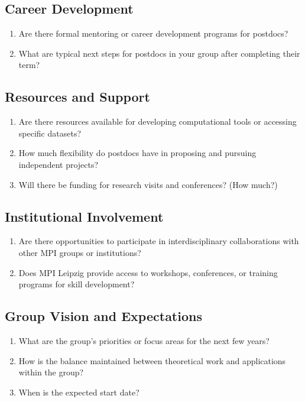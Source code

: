 \documentclass[12pt]{article}
\numberwithin{equation}{section}
\begin{document}
\subsection{Career Development}
\begin{enumerate}
    \item Are there formal mentoring or career development programs for postdocs?

    \item What are typical next steps for postdocs in your group after completing their term?
\end{enumerate}

\subsection{Resources and Support}
\begin{enumerate}
    \item Are there resources available for developing computational tools or accessing specific datasets?

    \item How much flexibility do postdocs have in proposing and pursuing independent projects?

    \item Will there be funding for research visits and conferences? (How much?)
\end{enumerate}

\subsection{Institutional Involvement}
\begin{enumerate}
    \item Are there opportunities to participate in interdisciplinary collaborations with other MPI groups or institutions?

    \item Does MPI Leipzig provide access to workshops, conferences, or training programs for skill development?
\end{enumerate}

\subsection{Group Vision and Expectations}
\begin{enumerate}
    \item What are the group’s priorities or focus areas for the next few years?

    \item How is the balance maintained between theoretical work and applications within the group?

    \item When is the expected start date?
\end{enumerate}
\end{document}
